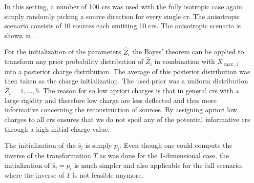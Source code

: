 In this setting, a number of 100 \glspl{cr} was used with the fully isotropic case again simply randomly picking a source direction for every single \gls{cr}. The anisotropic scenario consists of 10 sources each emitting 10 \glspl{cr}. The anisotropic scenario is shown in .

For the initialization of the parameters \(\hat Z_i\) the Bayes' theorem can be applied to transform any prior probability distribution of \(\hat Z_i\) in combination with \(X_{\max, i}\) into a posterior charge distribution. The average of this posterior distribution was then taken as the charge initialization. The used prior was a uniform distribution \(\hat Z_i = 1, \ldots, 5\). The reason for so low apriori charges is that in general \glspl{cr} with a large rigidity and therefore low charge are less deflected and thus more informative concerning the reconstruction of sources. By assigning apriori low charges to all \glspl{cr} ensures that we do not spoil any of the potential informative \glspl{cr} through a high initial charge value.

The initialization of the \(\hat s_i\) is simply \(p_i\). Even though one could compute the inverse of the transformation \(T\) as was done for the 1-dimensional case, the initialization of \(\hat s_i = p_i\) is much simpler and also applicable for the full scenario, where the inverse of \(T\) is not feasible anymore.


